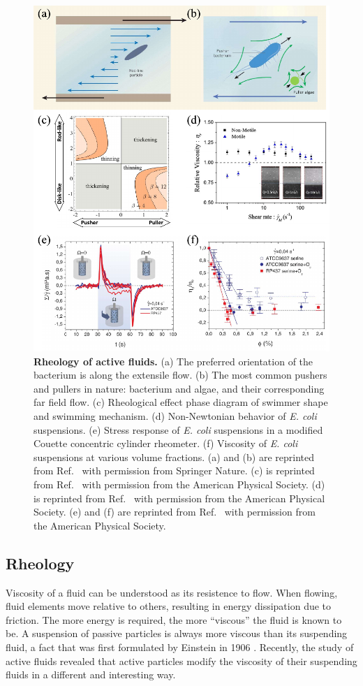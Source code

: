 \begin{figure}[!htbp]
	\begin{center}
	\includegraphics[height=4.5 in]{Figs/1-Intro/2.pdf}
	\end{center}
	\caption[Rheology of active fluids]
	{
	\textbf{Rheology of active fluids.}
	(a) The preferred orientation of the bacterium is along the extensile flow.
	(b) The most common pushers and pullers in nature: bacterium and algae, and their corresponding far field flow.
	(c) Rheological effect phase diagram of swimmer shape and swimming mechanism.
	(d) Non-Newtonian behavior of \textit{E. coli} suspensions.
	(e) Stress response of \textit{E. coli} suspensions in a modified Couette concentric cylinder rheometer.
	(f) Viscosity of \textit{E. coli} suspensions at various volume fractions.
	(a) and (b) are reprinted from Ref.~\cite{Marchetti2015} with permission from Springer Nature.
	(c) is reprinted from Ref.~\cite{Giomi2010} with permission from the American Physical Society.
	(d) is reprinted from Ref.~\cite{Gachelin2013} with permission from the American Physical Society.
	(e) and (f) are reprinted from Ref.~\cite{Lopez2015} with permission from the American Physical Society.
	}
	\label{fig:rheology-of-active-fluids}
\end{figure}

\subsection{Rheology}
\label{sec:rheology}
Viscosity of a fluid can be understood as its resistence to flow. When flowing, fluid elements move relative to others, resulting in energy dissipation due to friction. The more energy is required, the more ``viscous'' the fluid is known to be. A suspension
of passive particles is always more viscous than its suspending fluid, a fact that was first formulated by Einstein in 1906 \cite{Einstein1906}. Recently, the study of active fluids revealed that active particles modify the viscosity of their suspending fluids in a different and interesting way.

